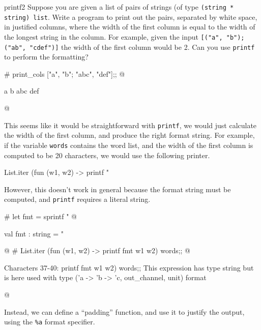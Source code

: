 %
\begin{exercise}{printf2}
Suppose you are given a list of pairs of strings (of
type \hbox{\lstinline+(string * string) list+}.  Write a program to
print out the pairs, separated by white space, in justified columns,
where the width of the first column is equal to the width of the
longest string in the column.  For example, given the
input \hbox{\lstinline+[("a", "b"); ("ab", "cdef")]+} the width of the
first column would be 2.  Can you use \hbox{\lstinline+printf+} to
perform the formatting?

\begin{ocaml}
# print_cols ["a", "b"; "abc", "def"];;
@
\begin{topoutput}
a   b
abc def
\end{topoutput}
@
\end{ocaml}

\begin{answer}\ifanswers
This seems like it would be straightforward
with \hbox{\lstinline+printf+}, we would just calculate the width of
the first column, and produce the right format string.  For example,
if the variable \hbox{\lstinline+words+} contains the word list, and
the width of the first column is computed to be 20 characters, we
would use the following printer.

\begin{ocaml}
List.iter (fun (w1, w2) ->
   printf "%
\end{ocaml}
%
However, this doesn't work in general because the format string must
be computed, and \hbox{\lstinline+printf+} requires a literal string.

\begin{ocaml}
# let fmt = sprintf "%
@
\begin{topoutput}
val fmt : string = "%
\end{topoutput}
@
# List.iter (fun (w1, w2) ->
     printf fmt w1 w2) words;;
@
\begin{toperror}
Characters 37-40:
     printf fmt w1 w2) words;;
This expression has type string but is here used with type
  ('a -> 'b -> 'c, out_channel, unit) format
\end{toperror}
@
\end{ocaml}
%
Instead, we can define a ``padding'' function,
and use it to justify the output, using the \hbox{\lstinline+%a+}
format specifier.


\end{answer}
\end{exercise}
